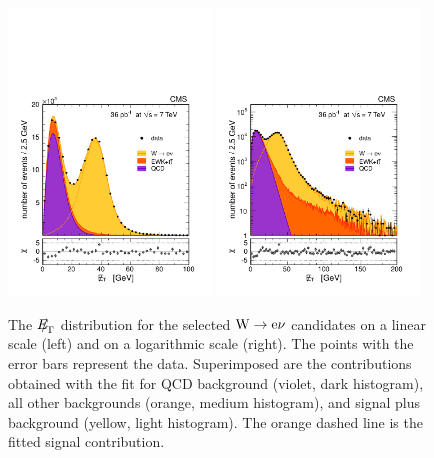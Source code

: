 \begin{figure}[htbp]
\begin{center}
\includegraphics[width=0.48\textwidth]{figs/w_inc_36pb.pdf}
\includegraphics[width=0.48\textwidth]{figs/w_inc_36pb_log.pdf}
\caption{ \label{fig:Wen}
The ${E\!\!\!/}_{\!\mathrm{T}}$ distribution for the selected $\mathrm{W} \rightarrow \mathrm{e}\nu$ candidates on
a linear scale (left) and on a logarithmic scale (right).
The points with the error bars represent the data. Superimposed are the
contributions obtained with the fit
for QCD background (violet, dark histogram), all other backgrounds
(orange, medium histogram), and signal plus  background (yellow, light histogram).
The orange dashed line is the fitted signal contribution.
}
\end{center}
\end{figure}

